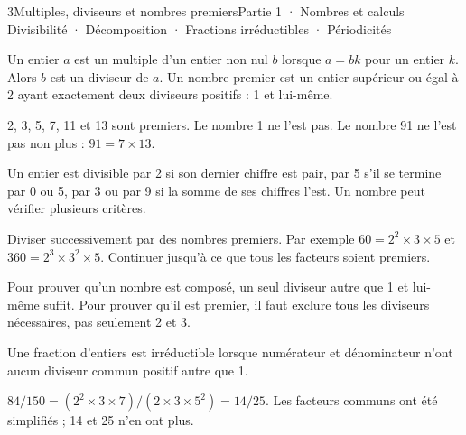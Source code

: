 \begin{ouverture}[courbe]{3}{Multiples, diviseurs et nombres premiers}{Partie 1 · Nombres et calculs}
{Divisibilité · Décomposition · Fractions irréductibles · Périodicités}
\end{ouverture}
\pagestyle{otMain}\essentiel\fontsize{11}{15}\selectfont
{}
\begin{definition}Un entier $a$ est un multiple d’un entier non nul $b$ lorsque $a=bk$ pour un entier $k$. Alors $b$ est un diviseur de $a$. Un nombre premier est un entier supérieur ou égal à 2 ayant exactement deux diviseurs positifs : 1 et lui-même.\end{definition}
\begin{exemple}2, 3, 5, 7, 11 et 13 sont premiers. Le nombre 1 ne l’est pas. Le nombre 91 ne l’est pas non plus : $91=7\times13$.\end{exemple}
\begin{propriete}Un entier est divisible par 2 si son dernier chiffre est pair, par 5 s’il se termine par 0 ou 5, par 3 ou par 9 si la somme de ses chiffres l’est. Un nombre peut vérifier plusieurs critères.\end{propriete}
\begin{savoirfaire}[Décomposer]Diviser successivement par des nombres premiers. Par exemple $60=2^2\times3\times5$ et $360=2^3\times3^2\times5$. Continuer jusqu’à ce que tous les facteurs soient premiers.\end{savoirfaire}
\begin{attention}Pour prouver qu’un nombre est composé, un seul diviseur autre que 1 et lui-même suffit. Pour prouver qu’il est premier, il faut exclure tous les diviseurs nécessaires, pas seulement 2 et 3.\end{attention}
\clearpage
{}
\begin{definition}Une fraction d’entiers est irréductible lorsque numérateur et dénominateur n’ont aucun diviseur commun positif autre que 1.\end{definition}
\begin{exemple}$84/150=(2^2\times3\times7)/(2\times3\times5^2)=14/25$. Les facteurs communs ont été simplifiés ; 14 et 25 n’en ont plus.\end{exemple}
